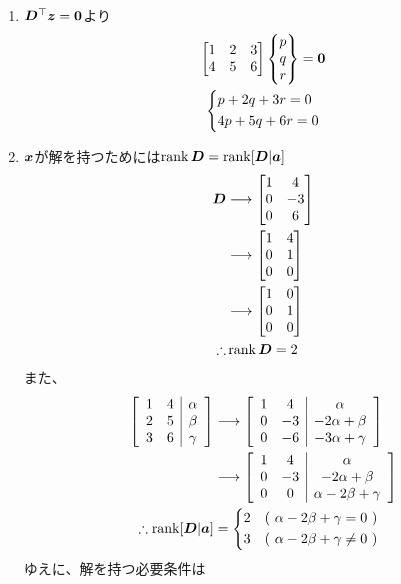 \begin{ans*}
  ${}$
  \begin{enumerate}[label=(\arabic*)]
    \item $\bm{D}^{\top}{\bm{z}} = \bm{0}$より
    \begin{gather}
      \bmat{
        1 & 2 & 3 \\
        4 & 5 & 6
      }\Bmat{
        p \\ q \\ r
      } = \bzv \\
      \begin{dcases*}
        p + 2q + 3r = 0 \\
        4p + 5q + 6r = 0
      \end{dcases*}
    \end{gather}
    \item ${\bm{x}}$が解を持つためには$\operatorname{rank} \bm{D} = \operatorname{rank} [\bm{D}|{\bm{a}}]$
    \begin{align}
      \bm{D}
      &\longrightarrow \begin{bmatrix}
        1 & 4 \\
        0 & -3 \\
        0 & 6
      \end{bmatrix} \\
      &\longrightarrow \begin{bmatrix}
        1 & 4 \\
        0 & 1 \\
        0 & 0
      \end{bmatrix} \\
      &\longrightarrow \begin{bmatrix}
        1 & 0 \\
        0 & 1 \\
        0 & 0
      \end{bmatrix} \\
      \therefore & \operatorname{rank} \bm{D} = 2
    \end{align}
    また、
    \begin{align}
      \left[\begin{array}{cc|c}
        1 & 4 & \gra \\
        2 & 5 & \beta \\
        3 & 6 & \grg
      \end{array}\right]
      &\lra \left[\begin{array}{cc|c}
        1 & 4 & \gra \\
        0 & -3 & -2 \gra + \beta \\
        0 & -6 & -3 \gra + \grg
      \end{array}\right] \\
      &\lra \left[\begin{array}{cc|c}
        1 & 4 & \gra \\
        0 & -3 & -2 \gra + \beta \\
        0 & 0 & \gra - 2 \beta + \grg
      \end{array}\right] \\
      \therefore\rank[\bD|\ba]&=
      \begin{dcases*}
        2 & (\dm{\gra - 2 \beta + \grg = 0}) \\
        3 & (\dm{\gra - 2 \beta + \grg \neq 0})
      \end{dcases*}
    \end{align}
    ゆえに、解を持つ必要条件は


\end{enumerate}
\end{ans*}
